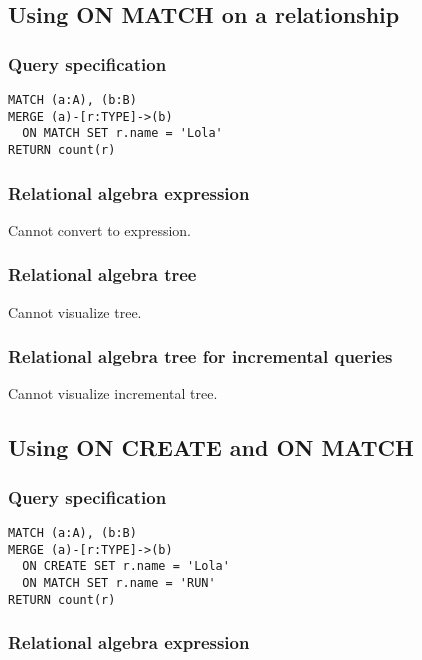 \subsection{Using ON MATCH on a relationship}

\subsubsection*{Query specification}

\begin{lstlisting}
MATCH (a:A), (b:B)
MERGE (a)-[r:TYPE]->(b)
  ON MATCH SET r.name = 'Lola'
RETURN count(r)
\end{lstlisting}

\subsubsection*{Relational algebra expression}

Cannot convert to expression.

\subsubsection*{Relational algebra tree}

Cannot visualize tree.

\subsubsection*{Relational algebra tree for incremental queries}

Cannot visualize incremental tree.

\subsection{Using ON CREATE and ON MATCH}

\subsubsection*{Query specification}

\begin{lstlisting}
MATCH (a:A), (b:B)
MERGE (a)-[r:TYPE]->(b)
  ON CREATE SET r.name = 'Lola'
  ON MATCH SET r.name = 'RUN'
RETURN count(r)
\end{lstlisting}

\subsubsection*{Relational algebra expression}

